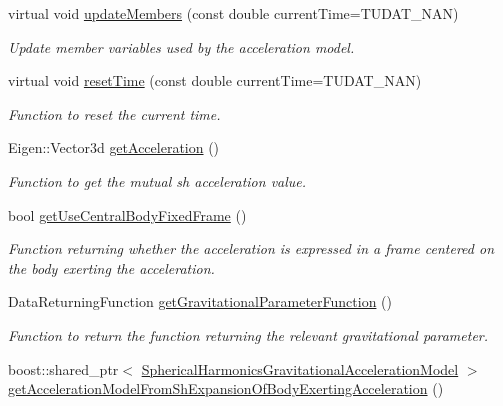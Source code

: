 \begin{DoxyCompactItemize}
virtual void \hyperlink{classtudat_1_1gravitation_1_1MutualSphericalHarmonicsGravitationalAccelerationModel_a5924a6d967e6f2168c2dcc9cb8c3d627}{update\+Members} (const double current\+Time=T\+U\+D\+A\+T\+\_\+\+N\+AN)
\begin{DoxyCompactList}\small\item\em Update member variables used by the acceleration model. \end{DoxyCompactList}\item 
virtual void \hyperlink{classtudat_1_1gravitation_1_1MutualSphericalHarmonicsGravitationalAccelerationModel_a59385d672fe32ef2cc3f9cda959a0d18}{reset\+Time} (const double current\+Time=T\+U\+D\+A\+T\+\_\+\+N\+AN)
\begin{DoxyCompactList}\small\item\em Function to reset the current time. \end{DoxyCompactList}\item 
Eigen\+::\+Vector3d \hyperlink{classtudat_1_1gravitation_1_1MutualSphericalHarmonicsGravitationalAccelerationModel_a9e317eb00b45c6890cdfc6b155b68175}{get\+Acceleration} ()
\begin{DoxyCompactList}\small\item\em Function to get the mutual sh acceleration value. \end{DoxyCompactList}\item 
bool \hyperlink{classtudat_1_1gravitation_1_1MutualSphericalHarmonicsGravitationalAccelerationModel_a75331f65a99468b30ceeab80e8257b44}{get\+Use\+Central\+Body\+Fixed\+Frame} ()
\begin{DoxyCompactList}\small\item\em Function returning whether the acceleration is expressed in a frame centered on the body exerting the acceleration. \end{DoxyCompactList}\item 
Data\+Returning\+Function \hyperlink{classtudat_1_1gravitation_1_1MutualSphericalHarmonicsGravitationalAccelerationModel_a98193f13cbb7e99569c50991fad4fc4f}{get\+Gravitational\+Parameter\+Function} ()
\begin{DoxyCompactList}\small\item\em Function to return the function returning the relevant gravitational parameter. \end{DoxyCompactList}\item 
boost\+::shared\+\_\+ptr$<$ \hyperlink{classtudat_1_1gravitation_1_1SphericalHarmonicsGravitationalAccelerationModel}{Spherical\+Harmonics\+Gravitational\+Acceleration\+Model} $>$ \hyperlink{classtudat_1_1gravitation_1_1MutualSphericalHarmonicsGravitationalAccelerationModel_a8fc48bcff16b9f7612fc5448dd2cfe2f}{get\+Acceleration\+Model\+From\+Sh\+Expansion\+Of\+Body\+Exerting\+Acceleration} ()

\end{DoxyCompactItemize}
